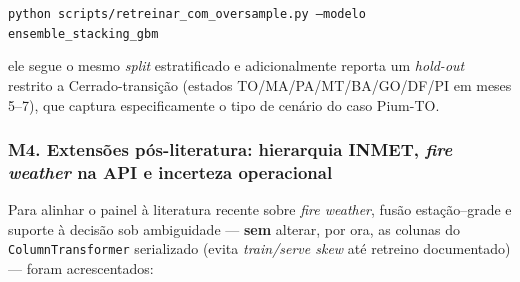 \begin{center}
\texttt{python scripts/retreinar\_com\_oversample.py --modelo ensemble\_stacking\_gbm}
\end{center}

\noindent ele segue o mesmo \emph{split} estratificado e adicionalmente reporta um \emph{hold-out} restrito a Cerrado-transição (estados TO/MA/PA/MT/BA/GO/DF/PI em meses 5--7), que captura especificamente o tipo de cenário do caso Pium-TO.

\subsubsection*{M4. Extensões pós-literatura: hierarquia INMET, \emph{fire weather} na API e incerteza operacional}

Para alinhar o painel à literatura recente sobre \emph{fire weather}, fusão estação--grade e suporte à decisão sob ambiguidade --- \textbf{sem} alterar, por ora, as colunas do \texttt{ColumnTransformer} serializado (evita \emph{train/serve skew} até retreino documentado) --- foram acrescentados:

